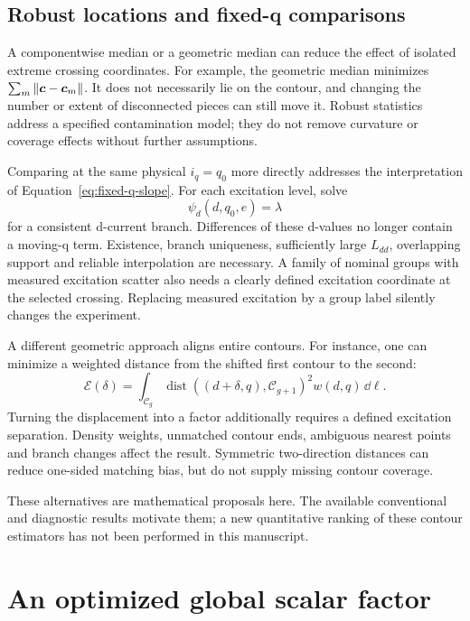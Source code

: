 \subsection{Robust locations and fixed-q comparisons}
A componentwise median or a geometric median can reduce the effect of isolated extreme crossing coordinates. For example, the geometric median minimizes $\sum_m\left\lVert\bm c-\bm c_m\right\rVert$. It does not necessarily lie on the contour, and changing the number or extent of disconnected pieces can still move it. Robust statistics address a specified contamination model; they do not remove curvature or coverage effects without further assumptions.

Comparing at the same physical $i_q=q_0$ more directly addresses the interpretation of Equation~\eqref{eq:fixed-q-slope}. For each excitation level, solve
\begin{equation}
\psi_d(d,q_0,e)=\lambda
\end{equation}
for a consistent d-current branch. Differences of these d-values no longer contain a moving-q term. Existence, branch uniqueness, sufficiently large $L_{dd}$, overlapping support and reliable interpolation are necessary. A family of nominal groups with measured excitation scatter also needs a clearly defined excitation coordinate at the selected crossing. Replacing measured excitation by a group label silently changes the experiment.

A different geometric approach aligns entire contours. For instance, one can minimize a weighted distance from the shifted first contour to the second:
\begin{equation}
\mathcal E(\delta)=
\int_{\mathcal C_g}
\operatorname{dist}\!\left((d+\delta,q),\mathcal C_{g+1}\right)^2
w(d,q)\,\dd\ell.
\end{equation}
Turning the displacement into a factor additionally requires a defined excitation separation. Density weights, unmatched contour ends, ambiguous nearest points and branch changes affect the result. Symmetric two-direction distances can reduce one-sided matching bias, but do not supply missing contour coverage.

These alternatives are mathematical proposals here. The available conventional and diagnostic results motivate them; a new quantitative ranking of these contour estimators has not been performed in this manuscript.

\section{An optimized global scalar factor}
